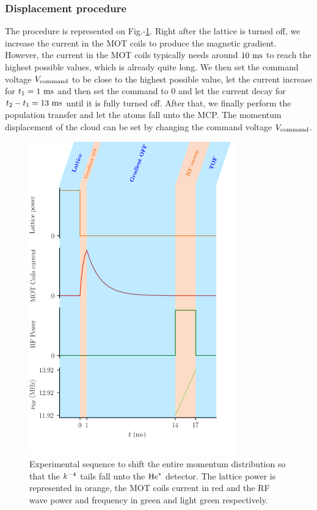 \subsubsection{Displacement procedure}

The procedure is represented on Fig.-\ref{fig:displacement_sequence}. Right after the lattice is turned off, we increase the current in the MOT coils to produce the magnetic gradient. However, the current in the MOT coils typically needs around $10 \ \rm{ms}$ to reach the highest possible values, which is already quite long. We then set the command voltage $V_{\rm{command}}$ to be close to the highest possible value, let the current increase for $t_1 = 1 \ \rm{ms}$ and then set the command to $0$ and let the current decay for $t_2-t_1=13 \ \rm{ms}$ until it is fully turned off. After that, we finally perform the population transfer and let the atoms fall unto the MCP. The momentum displacement of the cloud can be set by changing the command voltage $V_{\rm{command}}$.

\begin{figure}
    \centering
    \includegraphics[width=0.8\textwidth]{Fig/Chapter5/displacement_sequence.png}
    \caption{Experimental sequence to shift the entire momentum distribution so that the $k^{-4}$ tails fall unto the $\mathrm{He}^*$ detector. The lattice power is represented in orange, the MOT coils current in red and the RF wave power and frequency in green and light green respectively.}
    \label{fig:displacement_sequence}
\end{figure}

